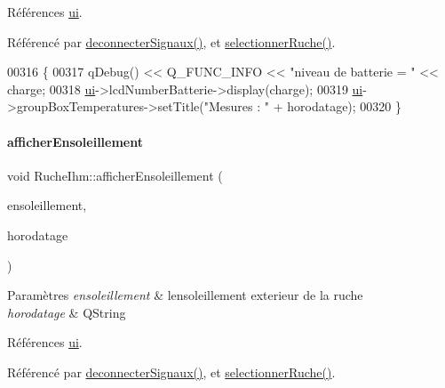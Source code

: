 Références \hyperlink{class_ruche_ihm_a64786058bd7f88ca2f1e9743bb27c25b}{ui}.



Référencé par \hyperlink{class_ruche_ihm_a348a76106f3072dd31a382c6025b8113}{deconnecter\+Signaux()}, et \hyperlink{class_ruche_ihm_a7324ae6ea574ccdad47783f466933157}{selectionner\+Ruche()}.


\begin{DoxyCode}
00316 \{
00317     qDebug() << Q\_FUNC\_INFO << \textcolor{stringliteral}{"niveau de batterie = "} << charge;
00318     \hyperlink{class_ruche_ihm_a64786058bd7f88ca2f1e9743bb27c25b}{ui}->lcdNumberBatterie->display(charge);
00319     \hyperlink{class_ruche_ihm_a64786058bd7f88ca2f1e9743bb27c25b}{ui}->groupBoxTemperatures->setTitle(\textcolor{stringliteral}{"Mesures : "} + horodatage);
00320 \}
\end{DoxyCode}
\mbox{\label{class_ruche_ihm_a8ee0041a209452e8e77f4a50adabff2b}} 
\paragraph{\texorpdfstring{afficher\+Ensoleillement}{afficherEnsoleillement}}
{\footnotesize\ttfamily void Ruche\+Ihm\+::afficher\+Ensoleillement (\begin{DoxyParamCaption}\item[{double}]{ensoleillement,  }\item[{Q\+String}]{horodatage }\end{DoxyParamCaption})\hspace{0.3cm}{\ttfamily [slot]}}


\begin{DoxyParams}{Paramètres}
{\em ensoleillement} & l\textquotesingle{}ensoleillement exterieur de la ruche \\
\hline
{\em horodatage} & Q\+String \\
\hline
\end{DoxyParams}


Références \hyperlink{class_ruche_ihm_a64786058bd7f88ca2f1e9743bb27c25b}{ui}.



Référencé par \hyperlink{class_ruche_ihm_a348a76106f3072dd31a382c6025b8113}{deconnecter\+Signaux()}, et \hyperlink{class_ruche_ihm_a7324ae6ea574ccdad47783f466933157}{selectionner\+Ruche()}.


